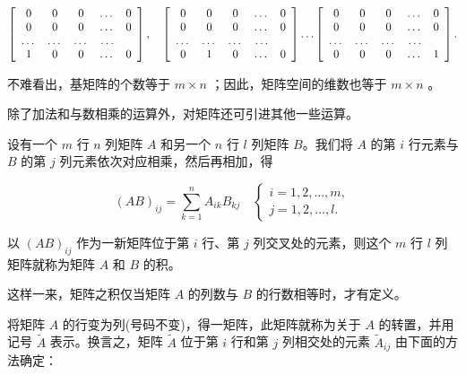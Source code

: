 \begin{equation*}
\left[ \begin{array}{c c c c c} 0 & 0 & 0 & \dots & 0 \\ 0 & 0 & 0 & \dots & 0 \\ \dots & \dots & \dots & \dots \\ 1 & 0 & 0 & \dots & 0 \end{array} \right], \quad \left[ \begin{array}{c c c c c} 0 & 0 & 0 & \dots & 0 \\ 0 & 0 & 0 & \dots & 0 \\ \dots & \dots & \dots & \dots \\ 0 & 1 & 0 & \dots & 0 \end{array} \right] \dots \left[ \begin{array}{c c c c c} 0 & 0 & 0 & \dots & 0 \\ 0 & 0 & 0 & \dots & 0 \\ \dots & \dots & \dots & \dots \\ 0 & 0 & 0 & \dots & 1 \end{array} \right].
\end{equation*}

不难看出，基矩阵的个数等于 $m \times n$ ；因此，矩阵空间的维数也等于 $m \times n$ 。

除了加法和与数相乘的运算外，对矩阵还可引进其他一些运算。

设有一个 $m$ 行 $n$ 列矩阵 $A$ 和另一个 $n$ 行 $l$ 列矩阵 $B$。我们将 $A$ 的第 $i$ 行元素与 $B$ 的第 $j$ 列元素依次对应相乘，然后再相加，得

\begin{equation*}
(A B) _ {i j} = \sum_ {k = 1} ^ {n} A _ {i k} B _ {k j} \quad \left\{ \begin{array}{l} i = 1, 2, \dots , m, \\ j = 1, 2, \dots , l. \end{array} \right.\tag{2.6}
\end{equation*}

以 $(AB)_{ij}$ 作为一新矩阵位于第 $i$ 行、第 $j$ 列交叉处的元素，则这个 $m$ 行 $l$ 列矩阵就称为矩阵 $A$ 和 $B$ 的积。

这样一来，矩阵之积仅当矩阵 $A$ 的列数与 $B$ 的行数相等时，才有定义。

将矩阵 $A$ 的行变为列(号码不变)，得一矩阵，此矩阵就称为关于 $A$ 的转置，并用记号 $\widetilde{A}$ 表示。换言之，矩阵 $\widetilde{A}$ 位于第 $i$ 行和第 $j$ 列相交处的元素 $\widetilde{A}_{ij}$ 由下面的方法确定：

